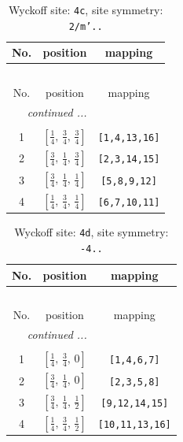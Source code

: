 \documentclass[fleqn,8pt]{jsarticle}
\begin{document}
\renewcommand{\arraystretch}{1.2}
\begin{longtable}{ccc}
\caption{Wyckoff site: {\tt 4c}, site symmetry: {\tt 2/m'..}}
 \\
 \hline \hline
No. & position & mapping \\ \hline \endfirsthead

\multicolumn{2}{l}{\tablename\ \thetable{}} \\
 \hline \hline
No. & position & mapping \\ \hline \endhead

 \hline \hline
\multicolumn{2}{r}{\footnotesize\it continued ...} \\ \endfoot

 \hline \hline
\multicolumn{2}{r}{} \\ \endlastfoot

1 & $\left[ \frac{1}{4},\, \frac{3}{4},\, \frac{3}{4} \right]$ & {\tt [1,4,13,16]} \\ \hline
2 & $\left[ \frac{3}{4},\, \frac{1}{4},\, \frac{3}{4} \right]$ & {\tt [2,3,14,15]} \\ \hline
3 & $\left[ \frac{3}{4},\, \frac{1}{4},\, \frac{1}{4} \right]$ & {\tt [5,8,9,12]} \\ \hline
4 & $\left[ \frac{1}{4},\, \frac{3}{4},\, \frac{1}{4} \right]$ & {\tt [6,7,10,11]} \\
\end{longtable}
\renewcommand{\arraystretch}{1.2}
\begin{longtable}{ccc}
\caption{Wyckoff site: {\tt 4d}, site symmetry: {\tt -4..}}
 \\
 \hline \hline
No. & position & mapping \\ \hline \endfirsthead

\multicolumn{2}{l}{\tablename\ \thetable{}} \\
 \hline \hline
No. & position & mapping \\ \hline \endhead

 \hline \hline
\multicolumn{2}{r}{\footnotesize\it continued ...} \\ \endfoot

 \hline \hline
\multicolumn{2}{r}{} \\ \endlastfoot

1 & $\left[ \frac{1}{4},\, \frac{3}{4},\, 0 \right]$ & {\tt [1,4,6,7]} \\ \hline
2 & $\left[ \frac{3}{4},\, \frac{1}{4},\, 0 \right]$ & {\tt [2,3,5,8]} \\ \hline
3 & $\left[ \frac{3}{4},\, \frac{1}{4},\, \frac{1}{2} \right]$ & {\tt [9,12,14,15]} \\ \hline
4 & $\left[ \frac{1}{4},\, \frac{3}{4},\, \frac{1}{2} \right]$ & {\tt [10,11,13,16]} \\
\end{longtable}
\end{document}
